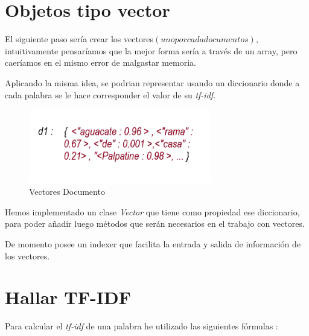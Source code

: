 \documentclass{article}
\begin{document}
\section{Objetos tipo vector} \label{sec : vector}

El siguiente paso sería crear los vectores$(uno por cada documentos)$, intuitivamente pensaríamos que la mejor forma sería a través de un array, pero 
caeríamos en el mismo error de malgastar memoria.

Aplicando la misma idea, se podrian representar usando un diccionario donde a cada palabra se le hace corresponder el valor de su
\textit{tf-idf}.


\begin{figure}[ht]
    \label{fig : tfidf}
    \includegraphics[width = 8cm]{./../images/tfidf.png}
    \caption{Vectores Documento}
\end{figure}

Hemos implementado un clase \textit{Vector} que tiene como propiedad ese diccionario, para poder añadir luego métodos que serán necesarios
en el trabajo con vectores.

De momento posee un indexer que facilita la entrada y salida de información de los vectores.

\section{Hallar TF-IDF} \label{sec : tf-idf}

Para calcular el \textit{tf-idf} de una palabra he utilizado las siguientes fórmulas : \\[1pt]
\end{document}
